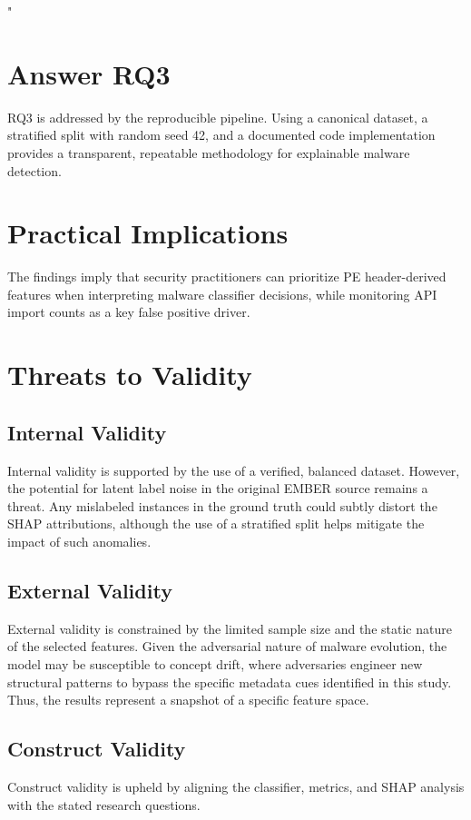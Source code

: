 "\documentclass[conference]{IEEEtran}
\begin{document}
\section{Answer RQ3}
RQ3 is addressed by the reproducible pipeline. Using a canonical dataset, a stratified split with random seed 42, and a documented code implementation provides a transparent, repeatable methodology for explainable malware detection.

\section{Practical Implications}
The findings imply that security practitioners can prioritize PE header-derived features when interpreting malware classifier decisions, while monitoring API import counts as a key false positive driver.

\section{Threats to Validity}

\subsection{Internal Validity}
Internal validity is supported by the use of a verified, balanced dataset. However, the potential for latent label noise in the original EMBER source remains a threat. Any mislabeled instances in the ground truth could subtly distort the SHAP attributions, although the use of a stratified split helps mitigate the impact of such anomalies.

\subsection{External Validity}
External validity is constrained by the limited sample size and the static nature of the selected features. Given the adversarial nature of malware evolution, the model may be susceptible to concept drift, where adversaries engineer new structural patterns to bypass the specific metadata cues identified in this study. Thus, the results represent a snapshot of a specific feature space.

\subsection{Construct Validity}
Construct validity is upheld by aligning the classifier, metrics, and SHAP analysis with the stated research questions.
\end{document}
